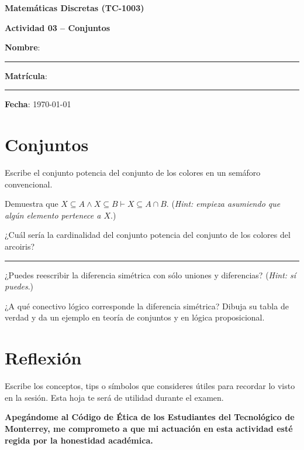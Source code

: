 \documentclass[spanish, 10pt]{article}
\newcommand{\responserule}{{\large\rule{14 cm}{0.3mm}}}
\begin{document}
\begin{center}
	{\Large \textbf{Matemáticas Discretas (TC-1003)}}
	
	\bigskip
	{\large \textbf{Actividad 03 -- Conjuntos}}
\end{center}

\bigskip
{\large \textbf{Nombre}: \rule{13.7 cm}{0.4mm}}



\bigskip
{\large \textbf{Matrícula}: \rule{5 cm}{0.4mm}} \hfill {\large \textbf{Fecha}: \today}

\bigskip


\section{Conjuntos}

Escribe el conjunto potencia del conjunto de los colores en un semáforo convencional.

\vspace{30ex}

Demuestra que $X \subseteq A \wedge X \subseteq B \vdash X \subseteq A \cap B$.
(\textit{Hint: empieza asumiendo que algún elemento pertenece a $X$}.)

\vspace{30ex}

¿Cuál sería la cardinalidad del conjunto potencia del conjunto de los colores del arcoiris?

\vspace{4ex}

\responserule

\pagebreak

¿Puedes reescribir la diferencia simétrica con sólo uniones y diferencias?
(\textit{Hint: sí puedes}.)

\vspace{30ex}

¿A qué conectivo lógico corresponde la diferencia simétrica?
Dibuja su tabla de verdad y da un ejemplo en teoría de conjuntos y en lógica proposicional.

\vspace{30ex}

\section{Reflexión}

Escribe los conceptos, tips o símbolos que consideres útiles para recordar lo visto en la sesión. Esta hoja te será de utilidad durante el examen.

\vfill

\textbf{Apegándome al Código de Ética de los Estudiantes del Tecnológico de Monterrey, me comprometo a que mi actuación en esta actividad esté regida por la honestidad académica.}
\end{document}
